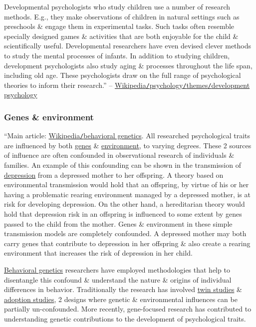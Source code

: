 \documentclass[oneside]{book}
\numberwithin{equation}{section}
\begin{document}
Developmental psychologists who study children use a number of research methods. E.g., they make observations of children in natural settings such as preschools \& engage them in experimental tasks. Such tasks often resemble specially designed games \& activities that are both enjoyable for the child \& scientifically useful. Developmental researchers have even devised clever methods to study the mental processes of infants. In addition to studying children, development psychologists also study aging \& processes throughout the life span, including old age. These psychologists draw on the full range of psychological theories to inform their research.'' -- \href{https://en.wikipedia.org/wiki/Psychology#Development_psychology}{Wikipedia\texttt{/}psychology\texttt{/}themes\texttt{/}development psychology}

\subsubsection{Genes \& environment}
``Main article: \href{https://en.wikipedia.org/wiki/Behavioral_genetics}{Wikipedia\texttt{/}behavioral genetics}. All researched psychological traits are influenced by both \href{https://en.wikipedia.org/wiki/Genes}{genes} \& \href{https://en.wikipedia.org/wiki/Social_environment}{environment}, to varying degrees. These 2 sources of influence are often confounded in observational research of individuals \& families. An example of this confounding can be shown in the transmission of \href{https://en.wikipedia.org/wiki/Depression_(mood)}{depression} from a depressed mother to her offspring. A theory based on environmental transmission would hold that an offspring, by virtue of his or her having a problematic rearing environment managed by a depressed mother, is at risk for developing depression. On the other hand, a hereditarian theory would hold that depression risk in an offspring is influenced to some extent by genes passed to the child from the mother. Genes \& environment in these simple transmission models are completely confounded. A depressed mother may both carry genes that contribute to depression in her offspring \& also create a rearing environment that increases the risk of depression in her child.

\href{https://en.wikipedia.org/wiki/Behavioral_genetics}{Behavioral genetics} researchers have employed methodologies that help to disentangle this confound \& understand the nature \& origins of individual differences in behavior. Traditionally the research has involved \href{https://en.wikipedia.org/wiki/Twin_studies}{twin studies} \& \href{https://en.wikipedia.org/wiki/Adoption_study}{adoption studies}, 2 designs where genetic \& environmental influences can be partially un-confounded. More recently, gene-focused research has contributed to understanding genetic contributions to the development of psychological traits.
\end{document}
